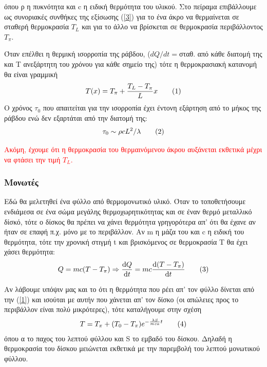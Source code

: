 \documentclass[a4paper]{article}
\newcommand\numberthis{\addtocounter{equation}{1}\tag{\theequation}}
\begin{document}
όπου ρ η πυκνότητα και c η ειδική θερμότητα του υλικού.
Στο πείραμα επιβάλλουμε ως συνοριακές συνθήκες της εξίσωσης (\ref{3}) για το ένα άκρο να θερμαίνεται σε σταθερή θερμοκρασία $T_L$ και για το άλλο να βρίσκεται σε θερμοκρασία περιβάλλοντος $T_\pi$. 
 

Όταν επέλθει η θερμική ισορροπία της ράβδου, ($dQ/dt=$σταθ. από κάθε διατομή της και Τ ανεξάρτητη του χρόνου για κάθε σημείο της) τότε η θερμοκρασιακή κατανομή θα είναι γραμμική
\begin{align*}\label{4}
T(x) = T_\pi +\frac{T_L-T_\pi}{L}x \numberthis
\end{align*}
Ο χρόνος $\tau_0$ που απαιτείται για την ισορροπία έχει έντονη εξάρτηση από το μήκος της ράβδου ενώ δεν εξαρτάται από την διατομή της: 
\begin{align*}\label{5}
\tau_0 \sim \rho c L^2 /\lambda \numberthis
\end{align*}

\textcolor{red}{Ακόμη, έχουμε ότι η θερμοκρασία του θερμαινόμενου άκρου αυξάνεται εκθετικά μέχρι να φτάσει την τιμή $T_L$.}

\subsubsection*{Μονωτές}

Εδώ θα μελετηθεί ένα φύλλο από θερμομονωτικό υλικό. Όταν το τοποθετήσουμε ενδιάμεσα σε ένα σώμα μεγάλης θερμοχωρητικότητας και σε έναν θερμό μεταλλικό δίσκό, τότε ο δίσκος θα πρέπει να χάνει θερμότητα γρηγορότερα απ' ότι θα έχανε αν ήταν σε επαφή π.χ. μόνο με το περιβάλλον. Αν m  η μάζα του και c η ειδική του θερμότητα, τότε την χρονική στιγμή t και βρισκόμενος σε θερμοκρασία T θα έχει χάσει θερμότητα:
\begin{align*} \label{6}
Q=mc(T-T_\pi) \Rightarrow \odv{Q}{t}=mc\odv{(T-T_\pi)}{t} \numberthis
\end{align*}

Αν λάβουμε υπόψιν μας και το ότι η θερμότητα που ρέει απ' τον φύλλο δίνεται από την (\ref{1}) και ισούται με αυτήν που χάνεται απ' τον δίσκο (οι απώλειες προς το περιβάλλον είναι πολύ μικρότερες), τότε καταλήγουμε στην σχέση 
\begin{align*}\label{7}
T = T_\pi + (T_0 - T_\pi )e^{-\frac{\lambda S}{mca}t} \numberthis
\end{align*}
όπου α το παχος του λεπτού φύλλου και S το εμβαδό του δίσκου. Δηλαδή η θερμοκρασία του δίσκου μειώνεται εκθετικά με την παρεμβολή του λεπτού μονωτικού φύλλου.
\end{document}
